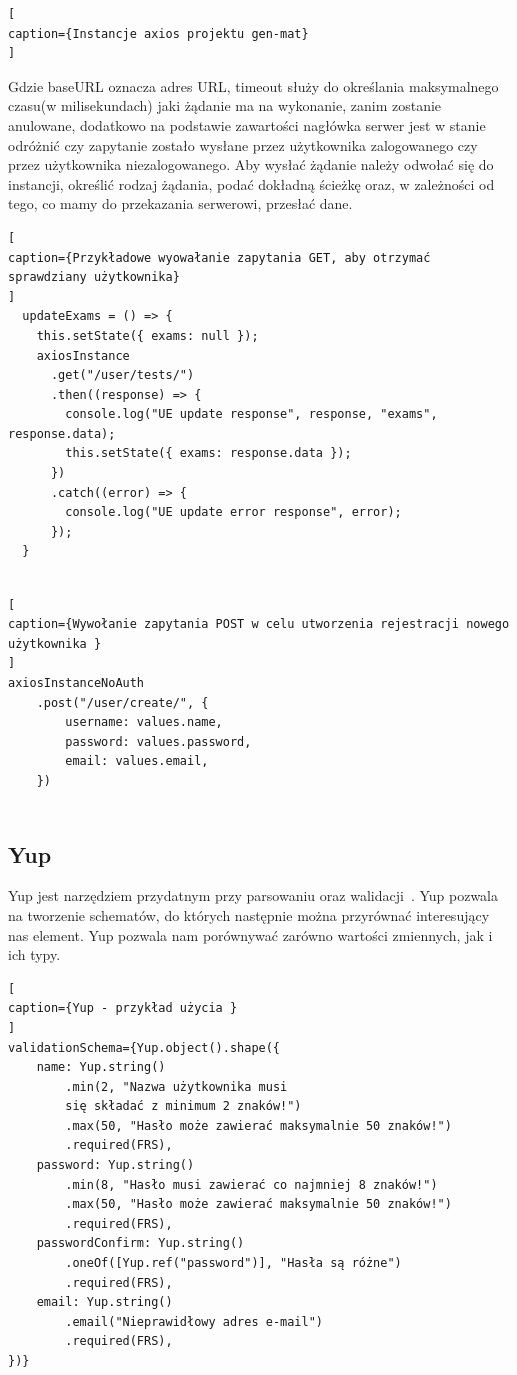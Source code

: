 \documentclass[oneside,polski,logo,indent]{amuthesis}
\begin{document}
\begin{enumerate}
\begin{enumerate}
\begin{lstlisting}[
caption={Instancje axios projektu gen-mat}
]
\end{lstlisting}

Gdzie baseURL oznacza adres URL, timeout służy do określania maksymalnego czasu(w milisekundach) jaki żądanie ma na wykonanie, zanim zostanie anulowane, dodatkowo na podstawie zawartości nagłówka serwer jest w stanie odróżnić czy zapytanie zostało wysłane przez użytkownika zalogowanego czy przez użytkownika niezalogowanego. Aby wysłać żądanie należy  odwołać się do instancji, określić rodzaj żądania, podać dokładną ścieżkę oraz, w zależności od tego, co mamy do przekazania serwerowi, przesłać dane.

\begin{lstlisting}[
caption={Przykładowe wyowałanie zapytania GET, aby otrzymać sprawdziany użytkownika}
]
  updateExams = () => {
    this.setState({ exams: null });
    axiosInstance
      .get("/user/tests/")
      .then((response) => {
        console.log("UE update response", response, "exams", response.data);
        this.setState({ exams: response.data });
      })
      .catch((error) => {
        console.log("UE update error response", error);
      });
  }


\end{lstlisting}

\pagebreak
\begin{lstlisting}[
caption={Wywołanie zapytania POST w celu utworzenia rejestracji nowego użytkownika }
]
axiosInstanceNoAuth
	.post("/user/create/", {
		username: values.name,
		password: values.password,
		email: values.email,
	})


\end{lstlisting}


\subsection{Yup}
Yup jest narzędziem przydatnym przy parsowaniu oraz walidacji~\cite{yup}. Yup pozwala na tworzenie schematów, do których następnie
można przyrównać interesujący nas element. Yup pozwala nam porównywać zarówno wartości zmiennych, jak i ich typy.

\begin{lstlisting}[
caption={Yup - przykład użycia }
]
validationSchema={Yup.object().shape({
	name: Yup.string()
		.min(2, "Nazwa użytkownika musi 
		się składać z minimum 2 znaków!")
		.max(50, "Hasło może zawierać maksymalnie 50 znaków!")
		.required(FRS),
	password: Yup.string()
		.min(8, "Hasło musi zawierać co najmniej 8 znaków!")
		.max(50, "Hasło może zawierać maksymalnie 50 znaków!")
		.required(FRS),
	passwordConfirm: Yup.string()
		.oneOf([Yup.ref("password")], "Hasła są różne")
		.required(FRS),
	email: Yup.string()
		.email("Nieprawidłowy adres e-mail")
		.required(FRS),
})}



\end{lstlisting}
\end{enumerate}
\end{enumerate}
\end{document}
